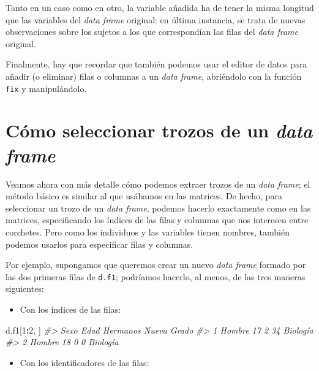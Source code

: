 \documentclass[
]{book}
\newenvironment{Shaded}{\begin{snugshade}}{\end{snugshade}}
\newcommand{\CommentTok}[1]{\textcolor[rgb]{0.56,0.35,0.01}{\textit{#1}}}
\newcommand{\DecValTok}[1]{\textcolor[rgb]{0.00,0.00,0.81}{#1}}
\newcommand{\NormalTok}[1]{#1}
\newcommand{\OperatorTok}[1]{\textcolor[rgb]{0.81,0.36,0.00}{\textbf{#1}}}
\providecommand{\tightlist}{%
  \setlength{\itemsep}{0pt}\setlength{\parskip}{0pt}}
\theoremstyle{definition}
\theoremstyle{definition}
\theoremstyle{definition}
\theoremstyle{remark}
\begin{document}
Tanto en un caso como en otro, la variable añadida ha de tener la misma longitud que las variables del \emph{data frame} original: en última instancia, se trata de nuevas observaciones sobre los sujetos a los que correspondían las filas del \emph{data frame} original.

Finalmente, hay que recordar que también podemos usar el editor de datos para añadir (o eliminar) filas o columnas a un \emph{data frame}, abriéndolo con la función \texttt{fix} y manipulándolo.

\hypertarget{cuxf3mo-seleccionar-trozos-de-un-data-frame}{%
\section{\texorpdfstring{Cómo seleccionar trozos de un \emph{data frame}}{Cómo seleccionar trozos de un data frame}}\label{cuxf3mo-seleccionar-trozos-de-un-data-frame}}

Veamos ahora con más detalle cómo podemos extraer trozos de un \emph{data frame}; el método básico es similar al que usábamos en las matrices. De hecho, para seleccionar un trozo de un \emph{data frame}, podemos hacerlo exactamente como en las matrices, especificando los índices de las filas y columnas que nos interesen entre corchetes. Pero como los individuos y las variables tienen nombres, también podemos usarlos para especificar filas y columnas.

Por ejemplo, supongamos que queremos crear un nuevo \emph{data frame} formado por las dos primeras filas de \texttt{d.f1}; podríamos hacerlo, al menos, de las tres maneras siguientes:

\begin{itemize}
\tightlist
\item
  Con los índices de las filas:
\end{itemize}

\begin{Shaded}
\begin{Highlighting}[]
\NormalTok{d.f1[}\DecValTok{1}\OperatorTok{:}\DecValTok{2}\NormalTok{, ]}
\CommentTok{\#\textgreater{}     Sexo Edad Hermanos Nueva    Grado}
\CommentTok{\#\textgreater{} 1 Hombre   17        2    34 Biología}
\CommentTok{\#\textgreater{} 2 Hombre   18        0     0 Biología}
\end{Highlighting}
\end{Shaded}

\begin{itemize}
\tightlist
\item
  Con los identificadores de las filas:
\end{itemize}
\end{document}
